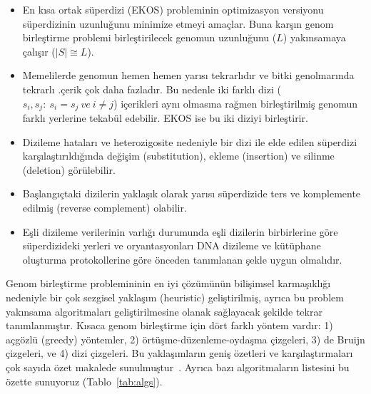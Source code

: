 \documentclass[11pt]{article}
\begin{document}
\begin{itemize}
\item
En kısa ortak süperdizi (EKOS) probleminin optimizasyon versiyonu süperdizinin
uzunluğunu minimize etmeyi amaçlar. Buna karşın genom birleştirme problemi
birleştirilecek genomun uzunluğunu ($L$) yakınsamaya çalışır ($|S|\cong L$).
\item
Memelilerde genomun hemen hemen yarısı tekrarlıdır ve bitki genolmarında tekrarlı .çerik çok daha fazladır. Bu nedenle iki farklı dizi ($s_i,s_j: ~s_i=s_j ~ve ~i\neq j$) içerikleri aynı olmasına rağmen birleştirilmiş genomun farklı yerlerine tekabül edebilir. EKOS ise bu iki diziyi birleştirir. 
\item
Dizileme hataları ve heterozigosite nedeniyle bir dizi ile elde edilen süperdizi karşılaştırıldığında
değişim (substitution), ekleme (insertion) ve silinme (deletion) görülebilir.
\item
Başlangıçtaki dizilerin yaklaşık olarak  yarısı süperdizide ters ve komplemente edilmiş (reverse complement) olabilir.
\item
Eşli dizileme verilerinin varlığı durumunda eşli dizilerin birbirlerine göre süperdizideki yerleri ve oryantasyonları DNA dizileme ve kütüphane oluşturma protokollerine göre önceden tanımlanan şekle uygun olmalıdır.
\end{itemize}

Genom birleştirme problemininin en iyi çözümünün bilişimsel karmaşıklığı nedeniyle bir çok 
sezgisel yaklaşım (heuristic) geliştirilmiş, ayrıca bu problem 
yakınsama algoritmaları geliştirilmesine olanak sağlayacak şekilde tekrar tanımlanmıştır.
Kısaca genom birleştirme için dört farklı yöntem vardır: 1) açgözlü (greedy) yöntemler, 2) örtüşme-düzenleme-oydaşma çizgeleri, 3) de Bruijn çizgeleri, ve 4) dizi çizgeleri. Bu yaklaşımların geniş özetleri ve karşılaştırmaları çok sayıda özet makalede sunulmuştur~\cite{Alkan2011b,Chaisson2015,Miller2010,Nagarajan2013,Zhang2011}. Ayrıca bazı algoritmaların listesini bu özette sunuyoruz (Tablo~\ref{tab:algs}).
\end{document}
